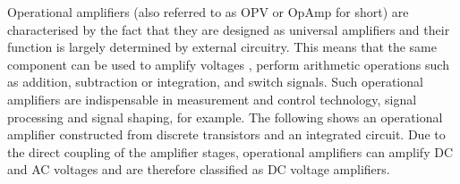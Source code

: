 \begin{frame}
{    %







    Operational amplifiers (also referred to as OPV or OpAmp for short) are characterised by the fact that 
    they are designed as universal amplifiers and their function is largely determined by external circuitry.
    This means that the same component can be used to amplify voltages , perform arithmetic operations such as addition, subtraction 
    or integration, and switch signals. Such operational amplifiers are indispensable in measurement and 
    control technology, signal processing and signal shaping, for example. The following shows an operational amplifier constructed from discrete 
    transistors and an integrated circuit.
    Due to the direct coupling of the amplifier stages, operational amplifiers
    can amplify DC and AC voltages and are therefore classified as 
    DC voltage amplifiers.
 


}
\end{frame}
